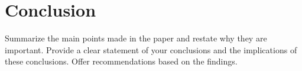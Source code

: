 \section{Conclusion}
Summarize the main points made in the paper and restate why they are important. Provide a clear statement of your conclusions and the implications of these conclusions. Offer recommendations based on the findings.